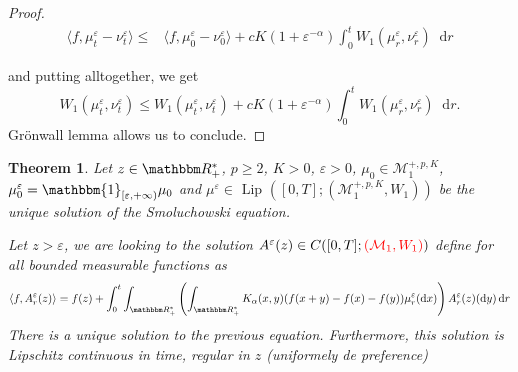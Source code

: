 \documentclass[a4paper,11pt, reqno]{amsart}
\newcommand{\cM}{\mathcal{M}}	\newcommand{\MM}{\mathbbm{M}}
\newcommand{\eps}{\varepsilon}
\newcommand{\dd}{\mathop{}\!\mathrm{d}}
\newcommand{\red}[1]{{\color{red} #1}}
\newcommand{\1}{\mathbbm{1}}
\theoremstyle{plain}
\newtheorem{theorem}{Theorem}[section]
\theoremstyle{definition}
\begin{document}
\begin{proof}
  \begin{align*}
    \langle f, \mu^{\eps}_t - \nu^{\eps}_t \rangle \le &
    \langle f, \mu^{\eps}_0 - \nu_0^{\eps} \rangle + c K (1 +
    \eps^{- \alpha}) \int_0^t W_1 (\mu^{\eps}_r,
    \nu^{\eps}_r) \dd r
  \end{align*}
  
  and putting alltogether, we get
  \[ W_1 (\mu_t^{\eps}, \nu_t^{\eps}) \le W_1
     (\mu_t^{\eps}, \nu_t^{\eps}) + c K (1 + \eps^{-
     \alpha}) \int_0^t W_1 (\mu^{\eps}_r, \nu^{\eps}_r) \dd
     r. \]
  Gr{\"o}nwall lemma allows us to conclude. 
\end{proof}

\begin{theorem}
  Let $z \in \RR_+^{\ast}$, \red{$p \ge 2$}, $K > 0$,
  $\eps > 0$, $\mu_0 \in \cM^{+, p, K}_1$, $\mu_0^{\eps}
  = \mathbbm{1}_{[\eps, + \infty)} \mu_0$ and $\mu^{\eps} \in
   \text{ Lip } ([0, T] ; (\cM^{+, p, K}_1, W_1))$ be the unique solution
  of the Smoluchowski equation.
  
  Let $z > \eps$, we are looking to the solution $A^{\eps} (z)
  \in C ([0, T] ; \red{(\cM_1, W_1)})$ define for all bounded
  measurable functions as
  \[ \langle f, A^{\eps}_r (z) \rangle = f (z) + \int_0^t
     \int_{\RR_+^{\ast}} \left( \int_{\RR_+^{\ast}} K_{\alpha}
     (x, y) (f (x + y) - f (x) - f (y)) \mu^{\eps}_r (\dd x) \right)
     A^{\eps}_r (z) (\dd y) \dd r \]
  \red{There is a unique solution to the previous equation.
  Furthermore, this solution is Lipschitz continuous in time, regular in $z$
  (uniformely de preference)}
\end{theorem}
\end{document}
